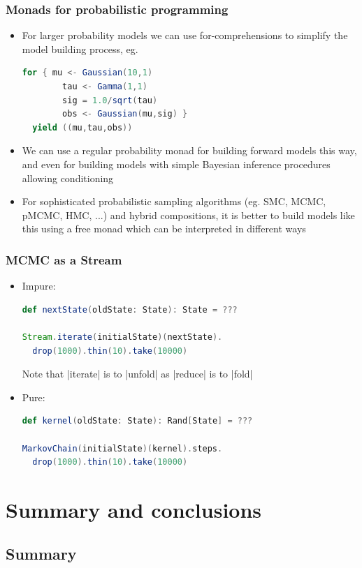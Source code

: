 \documentclass[mathserif,handout]{beamer}
\begin{document}
\begin{frame}[fragile]
  \frametitle{Monads for probabilistic programming}
  \begin{itemize}
    \item For larger probability models we can use \alert{for-comprehensions} to simplify the model building process, eg.
\begin{lstlisting}[language=scala]
  for { mu <- Gaussian(10,1)
        tau <- Gamma(1,1)
        sig = 1.0/sqrt(tau)
        obs <- Gaussian(mu,sig) }
  yield ((mu,tau,obs))
\end{lstlisting}
  \item We can use a regular probability monad for building forward models this way, and even for building models with simple Bayesian inference procedures allowing conditioning
    \item For sophisticated probabilistic sampling algorithms (eg. SMC, MCMC, pMCMC, HMC, ...) and hybrid compositions, it is better to build models like this using a \alert{free monad} which can be \alert{interpreted} in different ways
  \end{itemize}
\end{frame}

\begin{frame}[fragile]
\frametitle{MCMC as a Stream}
\begin{itemize}
\item Impure:
\begin{lstlisting}[language=scala]
def nextState(oldState: State): State = ???

Stream.iterate(initialState)(nextState).
  drop(1000).thin(10).take(10000)
\end{lstlisting}
Note that |iterate| is to |unfold| as |reduce| is to |fold|
\item Pure:
\begin{lstlisting}[language=scala]
def kernel(oldState: State): Rand[State] = ???

MarkovChain(initialState)(kernel).steps.
  drop(1000).thin(10).take(10000)
\end{lstlisting}  
\end{itemize}
\end{frame}


\section{Summary and conclusions}

\subsection{Summary}
\end{document}
